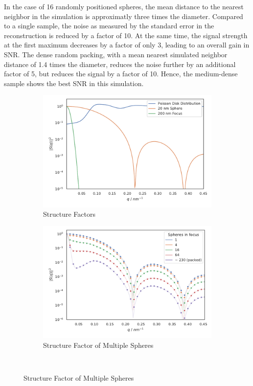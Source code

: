 In the case of 16 randomly positioned spheres, the mean distance to the nearest neighbor in the simulation is approximatly three times the diameter. Compared to a single sample, the noise as measured by the standard error in the reconstruction is reduced by a factor of 10. At the same time, the  signal strength at the first maximum decreases by a factor of only 3, leading to an overall gain in SNR.  The dense random packing, with a mean nearest simulated neighbor distance of 1.4 times the diameter, reduces the noise further by an additional factor of 5, but  reduces the signal by a factor of 10. Hence, the medium-dense sample shows the best SNR in this simulation.
 
\begin{figure}
	\centering
	\begin{subfigure}[b]{0.45\textwidth}
		\includegraphics[width=\linewidth]{images/multisphere1.pdf}
		\caption{Structure Factors}
		\label{fig:multisphere1}
	\end{subfigure}
	\begin{subfigure}[b]{0.45\textwidth}
		\includegraphics[width=\linewidth]{images/multisphere3.pdf}
		\caption{Structure Factor of Multiple Spheres}
		\label{fig:multisphere3}
	\end{subfigure}\\


\end{figure}
